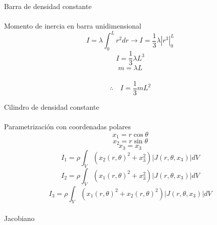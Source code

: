 \documentclass[10pt,a4papper]{article}
\begin{document}
\newpage
\LARGE
Barra de densidad constante\\\\
\Large
Momento de inercia en barra unidimensional\\
\[I=\lambda\int_0^Lr^2dr\to I=\frac{1}{3}\lambda|r^3|_0^L\]
\[I=\frac{1}{3}\lambda L^3\]
\[m=\lambda L\]\\
\[\boxed{\therefore\quad I=\frac{1}{3}mL^2}\]

\newpage
\LARGE
Cilindro de densidad constante\\\\
\Large
Parametrización con coordenadas polares
\[x_1=r\cos\theta\]
\[x_2=r\sin\theta\]
\[x_3=x_3\]
\[I_1=\rho\int_V(x_2(r,\theta)^2+x_3^2)|J(r,\theta,x_3)|dV\]
\[I_2=\rho\int_V(x_1(r,\theta)^2+x_3^2)|J(r,\theta,x_3)|dV\]
\[I_3=\rho\int_V(x_1(r,\theta)^2+x_2(r,\theta)^2)|J(r,\theta,x_3)|dV\]\\
Jacobiano\\
\end{document}
